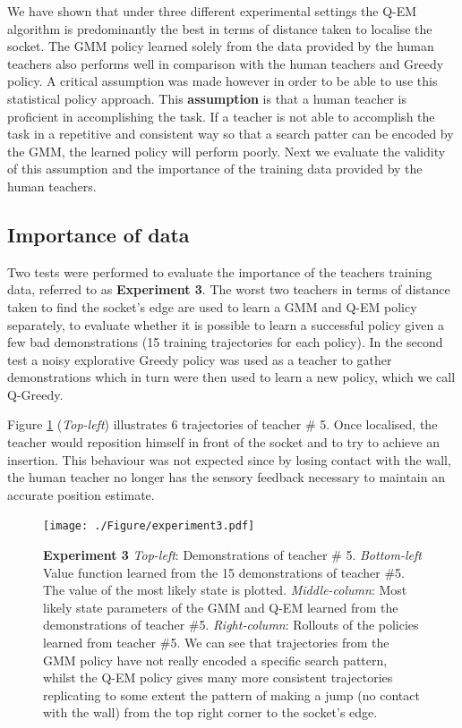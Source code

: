 \documentclass[final,5p,times,twocolumn]{elsarticle}
\begin{document}
We have shown that under three different experimental settings the Q-EM algorithm is predominantly the best in terms of distance taken 
to localise the socket. The GMM policy learned solely from the data provided by the human teachers also performs well in comparison
with the human teachers and Greedy policy. A critical assumption was made however in order to be able to use this statistical policy approach. 
This \textbf{assumption} is that a human teacher is proficient in accomplishing the task. If a teacher is not able to accomplish 
the task in a repetitive and consistent way so that a search patter can be encoded by the GMM, the learned policy will perform poorly.
Next we evaluate the validity of this assumption and the importance of the training data provided by the human teachers.
 
\subsection{Importance of data}

Two tests were performed to evaluate the importance of the teachers training data, referred to as \textbf{Experiment 3}.
The worst two teachers in terms of distance taken to find the socket's edge are used to learn a GMM and Q-EM policy separately, 
to evaluate whether it is possible to learn a successful policy given a few bad demonstrations 
(15 training trajectories for each policy). In the second test a noisy explorative Greedy policy was used
as a teacher to gather demonstrations which in turn were then used to learn a new policy, which we call Q-Greedy. 

Figure \ref{fig:experiment3} (\textit{Top-left}) illustrates 6 trajectories of teacher \# 5. Once localised, the teacher 
would reposition himself in front of the socket and to try to achieve an insertion. This behaviour was not expected 
since by losing contact with the wall, the human teacher no longer has the sensory feedback necessary 
to maintain an accurate position estimate.

\begin{figure}
 \centering
    \texttt{[image: ./Figure/experiment3.pdf]}
    \caption{\textbf{Experiment 3} \textit{Top-left}: Demonstrations of teacher \# 5. \textit{Bottom-left} Value function learned from the 15 demonstrations of teacher \#5. The value of the most 
    likely state is plotted. \textit{Middle-column}: Most likely state parameters of the GMM and Q-EM learned from the 
    demonstrations of teacher \#5. \textit{Right-column}: Rollouts of the policies learned from teacher \#5. We can see that trajectories 
    from the GMM policy have not really encoded a specific search pattern, whilst the Q-EM policy gives many more consistent trajectories 
    replicating to some extent the pattern of making a jump (no contact with the wall) from the top right corner to the socket's edge.}
    \label{fig:experiment3}
 \end{figure}
 
\end{document}
